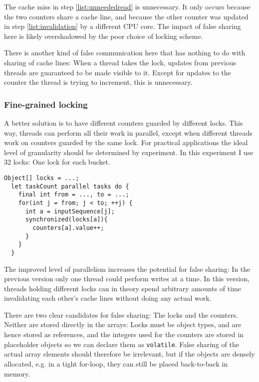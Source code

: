 The cache miss in step \ref{list:unneededread} is unnecessary. It only occurs
because the two counters share a cache line, and because the other counter was
updated in step \ref{list:invalidation} by a different CPU core. The impact of
false sharing here is likely overshadowed by the poor choice of locking scheme.

There is another kind of false communication here that has nothing to do with
sharing of cache lines:
When a thread takes the lock, updates from previous threads are guaranteed to be
made visible to it. Except for updates to the counter the thread is trying to
increment, this is unnecessary.

\subsubsection{Fine-grained locking}
A better solution is to have different counters guarded by different locks. This
way, threads can perform all their work in parallel, except when different
threads work on counters guarded by the same lock. For practical applications
the ideal level of granularity should be determined by experiment. In this
experiment I use 32 locks: One lock for each bucket.

\begin{code}
\begin{Verbatim}[frame=single]
  Object[] locks = ...;
  let taskCount parallel tasks do {
    final int from = ..., to = ...;
    for(int j = from; j < to; ++j) {
      int a = inputSequence[j];
      synchronized(locks[a]){
        counters[a].value++;
      }
    }
  }
\end{Verbatim}
\end{code}

The improved level of parallelism increases the potential for false sharing: In
the previous version only one thread could perform writes at a time. In this
version, threads holding different locks can in theory spend arbitrary amounts
of time invalidating each other's cache lines without doing any actual work.

There are two clear candidates for false sharing: The locks and the counters.
Neither are stored directly in the arrays: Locks must be object types, and are
hence stored as references, and the integers used for the counters are stored in
placeholder objects so we can declare them as \texttt{volatile}. False sharing
of the actual array elements should therefore be irrelevant, but if the objects
are densely allocated, e.g. in a tight for-loop, they can still be placed
back-to-back in memory.

